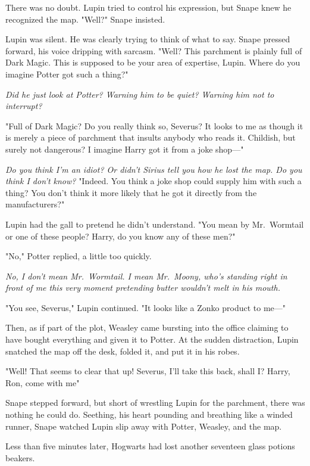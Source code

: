 There was no doubt. Lupin tried to control his expression, but Snape knew he recognized the map. "Well?" Snape insisted.

Lupin was silent. He was clearly trying to think of what to say. Snape pressed forward, his voice dripping with sarcasm. "Well? This parchment is plainly full of Dark Magic. This is supposed to be your area of expertise, Lupin. Where do you imagine Potter got such a thing?"

\emph{Did he just look at Potter? Warning him to be quiet? Warning him not to interrupt?}

"Full of Dark Magic? Do you really think so, Severus? It looks to me as though it is merely a piece of parchment that insults anybody who reads it. Childish, but surely not dangerous? I imagine Harry got it from a joke shop—"

\emph{Do you think I'm an idiot? Or didn't Sirius tell you how he lost the map. Do you think I don't know?} "Indeed. You think a joke shop could supply him with such a thing? You don't think it more likely that he got it directly from the manufacturers?"

Lupin had the gall to pretend he didn't understand. "You mean by Mr.~Wormtail or one of these people? Harry, do you know any of these men?"

"No," Potter replied, a little too quickly.

\emph{No, I don't mean Mr.~Wormtail. I mean Mr.~Moony, who's standing right in front of me this very moment pretending butter wouldn't melt in his mouth.}

"You see, Severus," Lupin continued. "It looks like a Zonko product to me—"

Then, as if part of the plot, Weasley came bursting into the office claiming to have bought everything and given it to Potter. At the sudden distraction, Lupin snatched the map off the desk, folded it, and put it in his robes.

"Well! That seems to clear that up! Severus, I'll take this back, shall I? Harry, Ron, come with me{\el}"

Snape stepped forward, but short of wrestling Lupin for the parchment, there was nothing he could do. Seething, his heart pounding and breathing like a winded runner, Snape watched Lupin slip away with Potter, Weasley, and the map.

Less than five minutes later, Hogwarts had lost another seventeen glass potions beakers.

\sbreak

